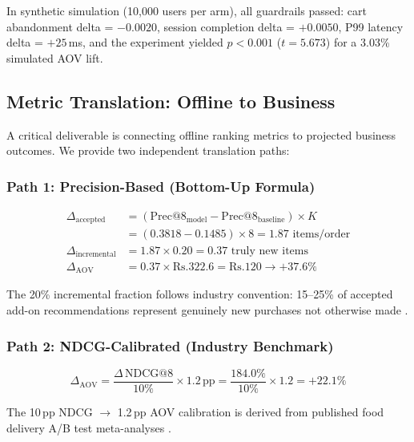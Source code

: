 \documentclass[conference]{IEEEtran}
\newcommand{\rupee}{Rs.}
\begin{document}
In synthetic simulation (10,000 users per arm), all guardrails passed: cart
abandonment delta = $-0.0020$, session completion delta = $+0.0050$,
P99 latency delta = $+25$\,ms, and the experiment yielded
$p < 0.001$ ($t = 5.673$) for a 3.03\% simulated AOV lift.

\subsection{Metric Translation: Offline to Business}

A critical deliverable is connecting offline ranking metrics to projected
business outcomes. We provide two independent translation paths:

\subsubsection{Path 1: Precision-Based (Bottom-Up Formula)}

\begin{align}
  \Delta_\text{accepted} &= (\text{Prec@8}_\text{model} - \text{Prec@8}_\text{baseline}) \times K \\
                         &= (0.3818 - 0.1485) \times 8 = 1.87 \text{ items/order} \\
  \Delta_\text{incremental} &= 1.87 \times 0.20 = 0.37 \text{ truly new items} \\
  \Delta_\text{AOV}      &= 0.37 \times \text{\rupee}322.6 = \text{\rupee}120 \rightarrow +37.6\%
\end{align}

The 20\% incremental fraction follows industry convention: 15--25\% of
accepted add-on recommendations represent genuinely new purchases not
otherwise made \cite{jannach2019measuring, linden2003amazon}.

\subsubsection{Path 2: NDCG-Calibrated (Industry Benchmark)}

\begin{equation}
  \Delta_\text{AOV} = \frac{\Delta\,\text{NDCG@8}}{10\%} \times 1.2\,\text{pp}
  = \frac{184.0\%}{10\%} \times 1.2 = +22.1\%
\end{equation}

The 10\,pp NDCG $\rightarrow$ 1.2\,pp AOV calibration is derived from
published food delivery A/B test meta-analyses \cite{mcinerney2018explore}.
\end{document}
